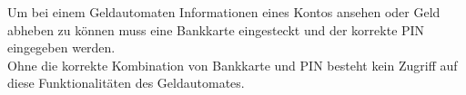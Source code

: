 Um bei einem Geldautomaten Informationen eines Kontos ansehen oder Geld abheben zu können 
muss eine Bankkarte eingesteckt und der korrekte PIN eingegeben werden.\\
Ohne die korrekte Kombination von Bankkarte und PIN besteht kein Zugriff auf diese Funktionalitäten des Geldautomates.